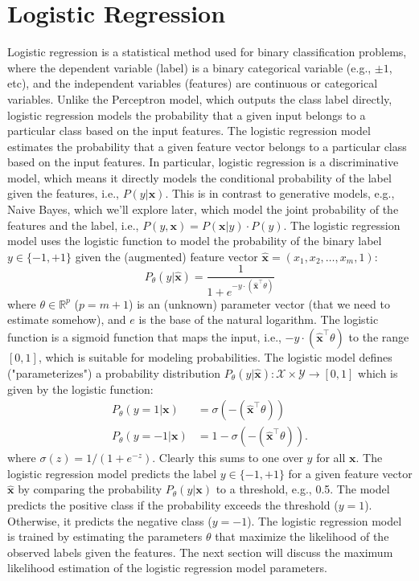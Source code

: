 \documentclass{article}[11pt]
\def\R{\mathbb{R}}
\begin{document}
\section{Logistic Regression}
Logistic regression is a statistical method used for binary classification problems, where the dependent variable (label) is a binary categorical variable (e.g., $\pm{1}$, etc), 
and the independent variables (features) are continuous or categorical variables. Unlike the Perceptron model, which outputs the class label directly, logistic regression models the probability that a given input belongs to a particular class based on the input features.
The logistic regression model estimates the probability that a given feature vector belongs to a particular class based on the input features.
In particular, logistic regression is a discriminative model, which means it directly models the conditional probability of the label given the features, i.e., $P(y|\mathbf{x})$.
This is in contrast to generative models, e.g., Naive Bayes, which we'll explore later, which model the joint probability of the features and the label, i.e., $P(y,\mathbf{x}) = P(\mathbf{x}|y)\cdot{P(y)}$.
The logistic regression model uses the logistic function to model the probability of the binary label $y\in\{-1,+1\}$ given the (augmented) feature vector $\hat{\mathbf{x}} = \left(x_{1},x_{2},\dots,x_{m},1\right)$:
\begin{equation}\label{eq:logistic}
P_{\theta}(y|\hat{\mathbf{x}}) = \frac{1}{1 + e^{-y\cdot\left(\hat{\mathbf{x}}^{\top}\theta\right)}}
\end{equation}
where $\theta\in\R^{p}$ ($p = m+1$) is an (unknown) parameter vector (that we need to estimate somehow), and $e$ is the base of the natural logarithm.
The logistic function is a sigmoid function that maps the input, i.e., $-y\cdot\left(\hat{\mathbf{x}}^{\top}\theta\right)$ to the range $[0,1]$, which is suitable for modeling probabilities.
The logistic model defines ("parameterizes") a probability distribution $P_{\theta}(y|\hat{\mathbf{x}}) : \mathcal{X} \times \mathcal{Y} \to [0,1]$ which is given by the logistic function:
\begin{align*}
P_\theta(y=1 | \mathbf{x}) & = \sigma(-\left(\hat{\mathbf{x}}^{\top}\theta\right)) \\
P_\theta(y=-1 | \mathbf{x}) & = 1-\sigma(-\left(\hat{\mathbf{x}}^{\top}\theta\right)).
\end{align*}
where $\sigma(z) = 1/(1+e^{-z})$. Clearly this sums to one over $y$ for all $\mathbf{x}$.
The logistic regression model predicts the label $y\in\{-1,+1\}$ for a given feature vector $\hat{\mathbf{x}}$ by comparing the probability $P_{\theta}(y|\mathbf{x})$ to a threshold, e.g., 0.5.
The model predicts the positive class if the probability exceeds the threshold ($y = 1$). Otherwise, it predicts the negative class ($y = -1$).
The logistic regression model is trained by estimating the parameters $\theta$ that maximize the likelihood of the observed labels given the features.
The next section will discuss the maximum likelihood estimation of the logistic regression model parameters.
\end{document}
